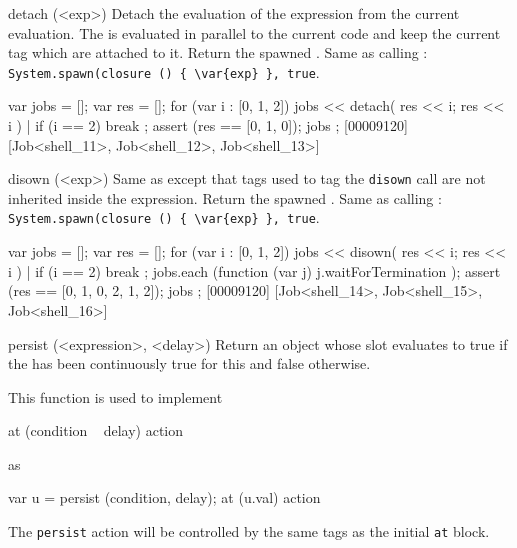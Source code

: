 \begin{urbiscriptapi}
\item[detach](<exp>)%
  Detach the evaluation of the expression  from the current
  evaluation.  The  is evaluated in parallel to the current code
  and keep the current tag which are attached to it.  Return the spawned
  .  Same as calling :
  \lstinline|System.spawn(closure () { \var{exp} }, true|.

\begin{urbiscript}
{
  var jobs = [];
  var res = [];
  for (var i : [0, 1, 2])
  {
    jobs << detach({ res << i; res << i }) |
    if (i == 2)
      break
  };
  assert (res == [0, 1, 0]);
  jobs
};
[00009120] [Job<shell_11>, Job<shell_12>, Job<shell_13>]
\end{urbiscript}


\item[disown](<exp>)%
  Same as  except that tags used to tag the
  \lstinline|disown| call are not inherited inside the expression.  Return
  the spawned .  Same as calling :
  \lstinline|System.spawn(closure () { \var{exp} }, true|.

\begin{urbiscript}
{
  var jobs = [];
  var res = [];
  for (var i : [0, 1, 2])
  {
    jobs << disown({ res << i; res << i }) |
    if (i == 2)
      break
  };
  jobs.each (function (var j) { j.waitForTermination });
  assert (res == [0, 1, 0, 2, 1, 2]);
  jobs
};
[00009120] [Job<shell_14>, Job<shell_15>, Job<shell_16>]
\end{urbiscript}


\item[persist](<expression>, <delay>)%
  Return an object whose  slot evaluates to true if the
   has been continuously true for this  and false
  otherwise.

  This function is used to implement

\begin{urbiunchecked}
at (condition ~ delay)
  action
\end{urbiunchecked}

  \noindent
  as

\begin{urbiunchecked}
var u = persist (condition, delay);
at (u.val)
  action
\end{urbiunchecked}

  The \lstinline|persist| action will be controlled by the same tags
  as the initial \lstinline|at| block.



\end{urbiscriptapi}


